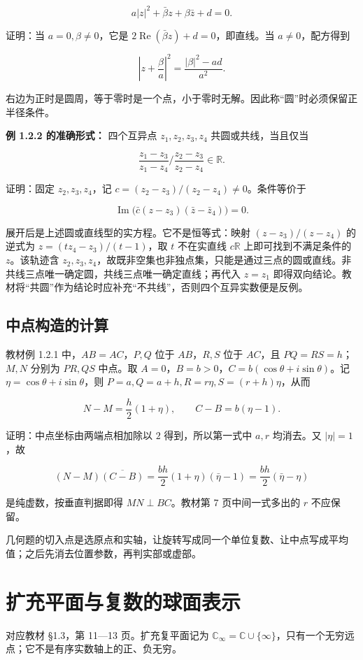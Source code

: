 \documentclass[11pt,a4paper]{article}
\begin{document}
\[
a|z|^2+\bar\beta z+\beta\bar z+d=0.
\]

证明：当 \(a=0,\beta\ne0\)，它是
\(2\operatorname{Re}(\bar\beta z)+d=0\)，即直线。当 \(a\ne0\)，配方得到

\[
\left|z+\frac\beta a\right|^2=\frac{|\beta|^2-ad}{a^2}.
\]

右边为正时是圆周，等于零时是一个点，小于零时无解。因此称``圆''时必须保留正半径条件。

\textbf{例 1.2.2 的准确形式：} 四个互异点 \(z_1,z_2,z_3,z_4\)
共圆或共线，当且仅当

\[
\frac{z_1-z_3}{z_1-z_4}\bigg/\frac{z_2-z_3}{z_2-z_4}\in\mathbb R.
\]

证明：固定 \(z_2,z_3,z_4\)，记 \(c=(z_2-z_3)/(z_2-z_4)\ne0\)。条件等价于

\[
\operatorname{Im}\bigl(\bar c(z-z_3)(\bar z-\bar z_4)\bigr)=0.
\]

展开后是上述圆或直线型的实方程。它不是恒等式：映射 \((z-z_3)/(z-z_4)\)
的逆式为 \(z=(tz_4-z_3)/(t-1)\)，取 \(t\) 不在实直线 \(c\mathbb R\)
上即可找到不满足条件的 \(z\)。该轨迹含
\(z_2,z_3,z_4\)，故既非空集也非独点集，只能是通过三点的圆或直线。非共线三点唯一确定圆，共线三点唯一确定直线；再代入
\(z=z_1\)
即得双向结论。教材将``共圆''作为结论时应补充``不共线''，否则四个互异实数便是反例。

\subsection{中点构造的计算}\label{ux4e2dux70b9ux6784ux9020ux7684ux8ba1ux7b97}

教材例 1.2.1 中，\(AB=AC\)，\(P,Q\) 位于 \(AB\)，\(R,S\) 位于 \(AC\)，且
\(PQ=RS=h\)；\(M,N\) 分别为 \(PR,QS\) 中点。取
\(A=0\)，\(B=b>0\)，\(C=b(\cos\theta+i\sin\theta)\)。记
\(\eta=\cos\theta+i\sin\theta\)，则
\(P=a,Q=a+h,R=r\eta,S=(r+h)\eta\)，从而

\[
N-M=\frac h2(1+\eta),\qquad C-B=b(\eta-1).
\]

证明：中点坐标由两端点相加除以 \(2\) 得到，所以第一式中 \(a,r\)
均消去。又 \(|\eta|=1\)，故

\[
(N-M)\overline{(C-B)}
=\frac{bh}{2}(1+\eta)(\bar\eta-1)
=\frac{bh}{2}(\bar\eta-\eta)
\]

是纯虚数，按垂直判据即得 \(MN\perp BC\)。教材第 7 页中间一式多出的 \(r\)
不应保留。

几何题的切入点是选原点和实轴，让旋转写成同一个单位复数、让中点写成平均值；之后先消去位置参数，再判实部或虚部。

\section{扩充平面与复数的球面表示}
对应教材 §1.3，第 11---13 页。扩充复平面记为
\(\mathbb C_\infty=\mathbb C\cup\{\infty\}\)，只有一个无穷远点；它不是有序实数轴上的正、负无穷。
\end{document}
